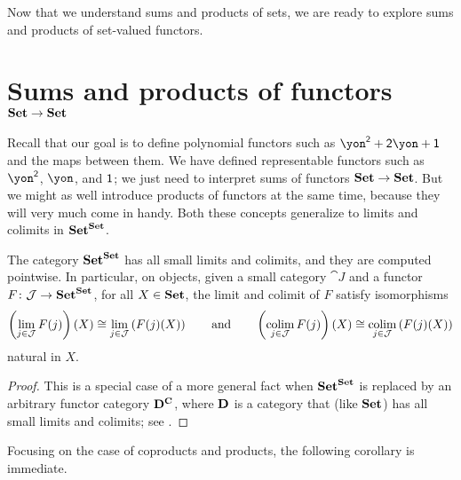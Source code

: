 \documentclass[Book-Poly]{subfiles}
\begin{document}
Now that we understand sums and products of sets, we are ready to explore sums and products of set-valued functors.

\section{Sums and products of functors $\mathbf{Set}\to\mathbf{Set}$} \label{sec.poly.rep-sets.sum-prod-func}

Recall that our goal is to define polynomial functors such as $\yon^\2+\2\yon+\1$ and the maps between them.
We have defined representable functors such as $\yon^\2$, $\yon$, and $\textsf{1}$; we just need to interpret sums of functors $\mathbf{Set}\to\mathbf{Set}$.
But we might as well introduce products of functors at the same time, because they will very much come in handy.
Both these concepts generalize to limits and colimits in $\mathbf{Set}^{\mathbf{Set}}$.

\begin{proposition} \label{prop.presheaf_lim_ptwise}
    The category $\mathbf{Set}^{\mathbf{Set}}$ has all small limits and colimits, and they are computed pointwise.
    In particular, on objects, given a small category $\cat{J}$ and a functor $F\colon \mathcal{J}\to\mathbf{Set}^{\mathbf{Set}}$, for all $X\in\mathbf{Set}$, the limit and colimit of $F$ satisfy isomorphisms
    \[
    \left(\lim_{j\in\mathcal{J}} F(j)\right)(X) \cong \lim_{j\in\mathcal{J}} \left(F(j)(X)\right) \qquad\text{and}\qquad \left(\operatorname*{colim}_{j\in\mathcal{J}} F(j)\right)(X) \cong \operatorname*{colim}_{j\in\mathcal{J}} \left(F(j)(X)\right)
    \]
    natural in $X$.
\end{proposition}
\begin{proof}
    This is a special case of a more general fact when $\mathbf{Set}^{\mathbf{Set}}$ is replaced by an arbitrary functor category $\mathbf{D}^{\mathbf{C}}$, where $\mathbf{D}$ is a category that (like $\mathbf{Set}$) has all small limits and colimits; see \cite[pages 22--23, displays (24) and (25)]{macLane1992sheaves}.
\end{proof}

Focusing on the case of coproducts and products, the following corollary is immediate.
\end{document}
